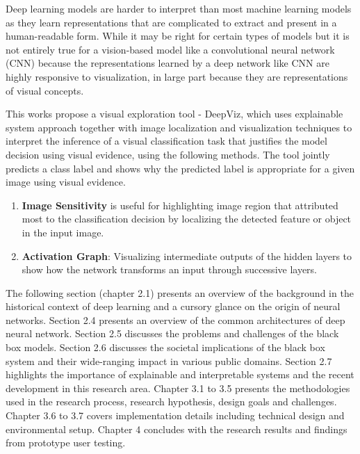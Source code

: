 Deep learning models are harder to interpret than most machine learning models as they learn representations that are complicated to extract and present in a human-readable form.  While it may be right for certain types of models but it is not entirely true for a vision-based model like a convolutional neural network (CNN) because the representations learned by a deep network like CNN are highly responsive to visualization, in large part because they are representations of visual concepts. 

This works propose a visual exploration tool - DeepViz, which uses explainable system approach together with image localization and visualization techniques to interpret the inference of a visual classification task that justifies the model decision using visual evidence, using the following methods. The tool jointly predicts a class label and shows why the predicted label is appropriate for a given image using visual evidence.

\begin{enumerate}
\item \textbf{Image Sensitivity} is useful for highlighting image region that attributed most to the classification decision by localizing the detected feature or object in the input image.


\item  \textbf{Activation Graph}: Visualizing intermediate outputs of the hidden layers to show how the network transforms an input through successive layers.

\end{enumerate}

The following section (chapter 2.1) presents an overview of the background in the historical context of deep learning and a cursory glance on the origin of neural networks. Section 2.4 presents an overview of the common architectures of deep neural network. Section 2.5 discusses the problems and challenges of the black box models. Section 2.6 discusses the societal implications of the black box system and their wide-ranging impact in various public domains. Section 2.7 highlights the importance of explainable and interpretable systems and the recent development in this research area. Chapter 3.1 to 3.5 presents the methodologies used in the research process, research hypothesis, design goals and challenges. Chapter 3.6 to 3.7 covers implementation details including technical design and environmental setup. Chapter 4 concludes with the research results and findings from prototype user testing.


\iffalse %

\fi %